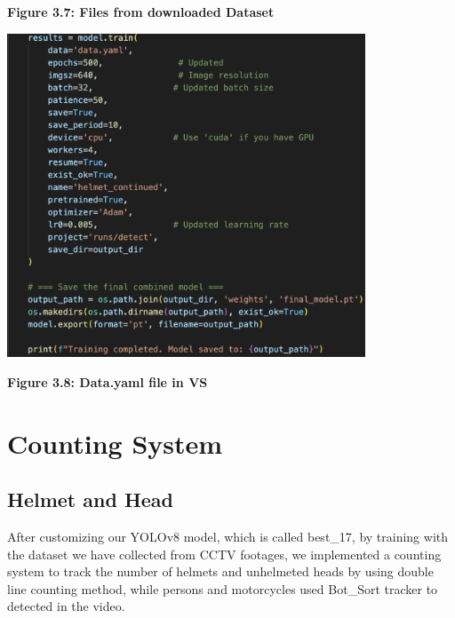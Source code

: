 \begin{itemize}
\begin{center}
		\vspace{0.5em}
		\textbf{Figure 3.7:  Files from downloaded Dataset }
	\end{center}
	\begin{center}
		\includegraphics[width=0.8\textwidth]{yaml.png}
		
		\vspace{0.5em}
		\textbf{Figure 3.8:  Data.yaml file in VS}
	\end{center}
\end{itemize}

\section{\textbf{Counting System}}
\subsection{Helmet and Head}

\noindent\hspace{2.5em}After customizing our YOLOv8 model, which is called best\_17, by training with the dataset we have collected from CCTV footages, we implemented a counting system to track the number of helmets and unhelmeted heads by using double line counting method, while  persons and motorcycles used Bot\_Sort tracker to detected in the video.



